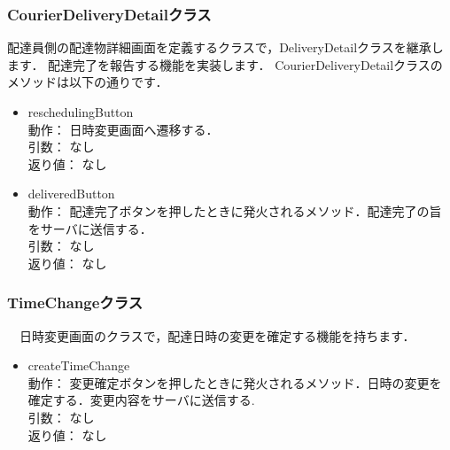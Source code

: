 \documentclass[a4j,titlepage]{jarticle}
\begin{document}
\subsubsection{CourierDeliveryDetailクラス}
配達員側の配達物詳細画面を定義するクラスで，DeliveryDetailクラスを継承します．
配達完了を報告する機能を実装します．
CourierDeliveryDetailクラスのメソッドは以下の通りです．
\begin{itemize}
\item reschedulingButton\\
 動作： 日時変更画面へ遷移する．\\
 引数： なし\\
 返り値： なし

\item deliveredButton\\
 動作： 配達完了ボタンを押したときに発火されるメソッド．配達完了の旨をサーバに送信する．\\
 引数： なし\\
 返り値： なし
\end{itemize}

\subsubsection{TimeChangeクラス}
　日時変更画面のクラスで，配達日時の変更を確定する機能を持ちます．
\begin{itemize}
 \item createTimeChange\\
   動作： 変更確定ボタンを押したときに発火されるメソッド．日時の変更を確定する．変更内容をサーバに送信する.\\
 引数： なし\\
 返り値： なし
\end{itemize}
\end{document}
